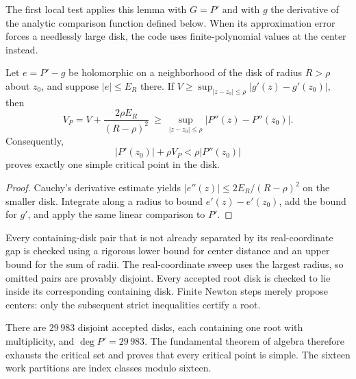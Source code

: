 \documentclass[11pt,a4paper]{article}
\begin{document}
The first local test applies this lemma with $G=P'$ and with $g$ the derivative
of the analytic comparison function defined below. When its approximation
error forces a needlessly large disk, the code uses finite-polynomial values
at the center instead.

\begin{lemma}\label{lem:finite}
Let $e=P'-g$ be holomorphic on a neighborhood of the disk of radius $R>\rho$
about $z_0$, and suppose $|e|\le E_R$ there. If
$V\ge\sup_{|z-z_0|\le\rho}|g'(z)-g'(z_0)|$, then
\[
 V_P=V+\frac{2\rho E_R}{(R-\rho)^2}
 \ \ge\ \sup_{|z-z_0|\le\rho}|P''(z)-P''(z_0)|.
\]
Consequently,
\begin{equation}\label{eq:finite}
 |P'(z_0)|+\rho V_P<\rho|P''(z_0)|
\end{equation}
proves exactly one simple critical point in the disk.
\end{lemma}
\begin{proof}
Cauchy's derivative estimate yields $|e''(z)|\le2E_R/(R-\rho)^2$ on the
smaller disk. Integrate along a radius to bound $e'(z)-e'(z_0)$, add the
bound for $g'$, and apply the same linear comparison to $P'$.
\end{proof}

Every containing-disk pair that is not already separated by its real-coordinate
gap is checked using a rigorous lower bound for center distance and an upper
bound for the sum of radii. The real-coordinate sweep uses the largest radius,
so omitted pairs are provably disjoint. Every accepted root disk is checked
to lie inside its corresponding containing disk. Finite Newton steps merely
propose centers: only the subsequent strict inequalities certify a root.

There are $29\,983$ disjoint accepted disks, each containing one root with
multiplicity, and $\deg P'=29\,983$. The fundamental theorem of algebra
therefore exhausts the critical set and proves that every critical point
is simple. The sixteen work partitions are index classes modulo sixteen.
\end{document}
